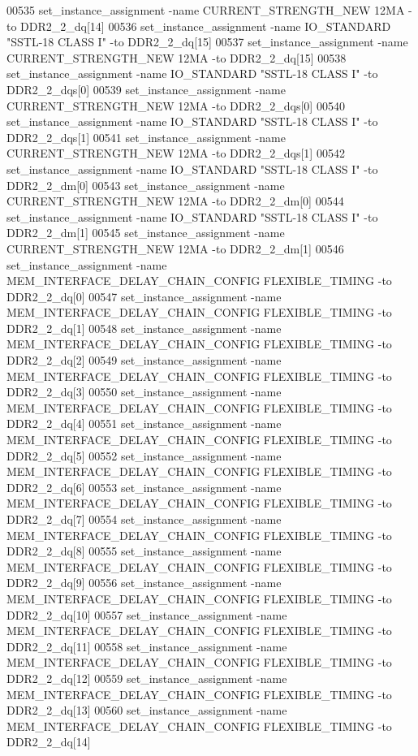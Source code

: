 \begin{DoxyCode}
00535 set\_instance\_assignment -name CURRENT\_STRENGTH\_NEW 12MA -to DDR2\_2\_dq[14]
00536 set\_instance\_assignment -name IO\_STANDARD "SSTL-18 CLASS I" -to DDR2\_2\_dq[15]
00537 set\_instance\_assignment -name CURRENT\_STRENGTH\_NEW 12MA -to DDR2\_2\_dq[15]
00538 set\_instance\_assignment -name IO\_STANDARD "SSTL-18 CLASS I" -to DDR2\_2\_dqs[0]
00539 set\_instance\_assignment -name CURRENT\_STRENGTH\_NEW 12MA -to DDR2\_2\_dqs[0]
00540 set\_instance\_assignment -name IO\_STANDARD "SSTL-18 CLASS I" -to DDR2\_2\_dqs[1]
00541 set\_instance\_assignment -name CURRENT\_STRENGTH\_NEW 12MA -to DDR2\_2\_dqs[1]
00542 set\_instance\_assignment -name IO\_STANDARD "SSTL-18 CLASS I" -to DDR2\_2\_dm[0]
00543 set\_instance\_assignment -name CURRENT\_STRENGTH\_NEW 12MA -to DDR2\_2\_dm[0]
00544 set\_instance\_assignment -name IO\_STANDARD "SSTL-18 CLASS I" -to DDR2\_2\_dm[1]
00545 set\_instance\_assignment -name CURRENT\_STRENGTH\_NEW 12MA -to DDR2\_2\_dm[1]
00546 set\_instance\_assignment -name MEM\_INTERFACE\_DELAY\_CHAIN\_CONFIG FLEXIBLE\_TIMING -to DDR2\_2\_dq[0]
00547 set\_instance\_assignment -name MEM\_INTERFACE\_DELAY\_CHAIN\_CONFIG FLEXIBLE\_TIMING -to DDR2\_2\_dq[1]
00548 set\_instance\_assignment -name MEM\_INTERFACE\_DELAY\_CHAIN\_CONFIG FLEXIBLE\_TIMING -to DDR2\_2\_dq[2]
00549 set\_instance\_assignment -name MEM\_INTERFACE\_DELAY\_CHAIN\_CONFIG FLEXIBLE\_TIMING -to DDR2\_2\_dq[3]
00550 set\_instance\_assignment -name MEM\_INTERFACE\_DELAY\_CHAIN\_CONFIG FLEXIBLE\_TIMING -to DDR2\_2\_dq[4]
00551 set\_instance\_assignment -name MEM\_INTERFACE\_DELAY\_CHAIN\_CONFIG FLEXIBLE\_TIMING -to DDR2\_2\_dq[5]
00552 set\_instance\_assignment -name MEM\_INTERFACE\_DELAY\_CHAIN\_CONFIG FLEXIBLE\_TIMING -to DDR2\_2\_dq[6]
00553 set\_instance\_assignment -name MEM\_INTERFACE\_DELAY\_CHAIN\_CONFIG FLEXIBLE\_TIMING -to DDR2\_2\_dq[7]
00554 set\_instance\_assignment -name MEM\_INTERFACE\_DELAY\_CHAIN\_CONFIG FLEXIBLE\_TIMING -to DDR2\_2\_dq[8]
00555 set\_instance\_assignment -name MEM\_INTERFACE\_DELAY\_CHAIN\_CONFIG FLEXIBLE\_TIMING -to DDR2\_2\_dq[9]
00556 set\_instance\_assignment -name MEM\_INTERFACE\_DELAY\_CHAIN\_CONFIG FLEXIBLE\_TIMING -to DDR2\_2\_dq[10]
00557 set\_instance\_assignment -name MEM\_INTERFACE\_DELAY\_CHAIN\_CONFIG FLEXIBLE\_TIMING -to DDR2\_2\_dq[11]
00558 set\_instance\_assignment -name MEM\_INTERFACE\_DELAY\_CHAIN\_CONFIG FLEXIBLE\_TIMING -to DDR2\_2\_dq[12]
00559 set\_instance\_assignment -name MEM\_INTERFACE\_DELAY\_CHAIN\_CONFIG FLEXIBLE\_TIMING -to DDR2\_2\_dq[13]
00560 set\_instance\_assignment -name MEM\_INTERFACE\_DELAY\_CHAIN\_CONFIG FLEXIBLE\_TIMING -to DDR2\_2\_dq[14]

\end{DoxyCode}
